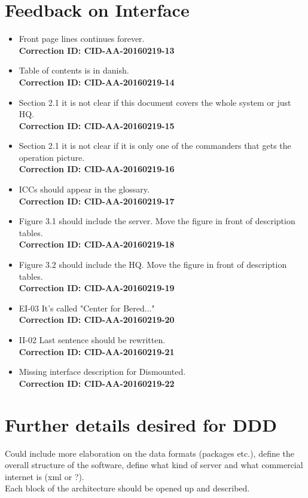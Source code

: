 \newpage
\section*{Feedback on Interface}
\begin{itemize}
    \item Front page lines continues forever. \\ \textbf{Correction ID: CID-AA-20160219-13}
    \item Table of contents is in danish. \\ \textbf{Correction ID: CID-AA-20160219-14}
    \item Section 2.1 it is not clear if this document covers the whole system or just HQ. \\ \textbf{Correction ID: CID-AA-20160219-15}
    \item Section 2.1 it is not clear if it is only one of the commanders that gets the operation picture. \\ \textbf{Correction ID: CID-AA-20160219-16}
    \item ICCs should appear in the glossary. \\ \textbf{Correction ID: CID-AA-20160219-17}
    \item Figure 3.1 should include the server. Move the figure in front of description tables. \\ \textbf{Correction ID: CID-AA-20160219-18}
    \item Figure 3.2 should include the HQ. Move the figure in front of description tables. \\ \textbf{Correction ID: CID-AA-20160219-19}
    \item EI-03 It's called "Center for Bered..." \\ \textbf{Correction ID: CID-AA-20160219-20}
    \item II-02 Last sentence should be rewritten. \\ \textbf{Correction ID: CID-AA-20160219-21}
    \item Missing interface description for Dismounted. \\ \textbf{Correction ID: CID-AA-20160219-22}
\end{itemize}


\section*{Further details desired for DDD}
Could include more elaboration on the data formats (packages etc.), define the overall structure of the software, define what kind of server and what commercial internet is (xml or ?).\\
Each block of the architecture should be opened up and described.

